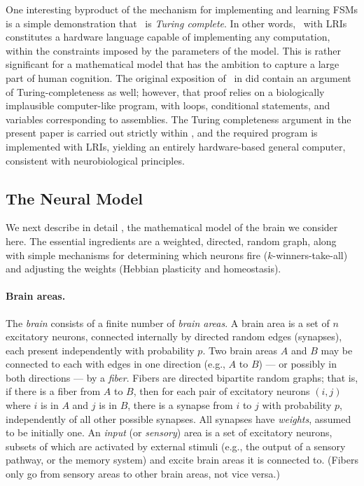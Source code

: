 \documentclass[12pt,nosubfloats]{alt2024} %
\newcommand{\1}{\mathbbm{1}}
\begin{document}
One interesting byproduct of the mechanism for implementing and learning FSMs is a simple demonstration that \name\ is {\em Turing complete}. In other words, \name\  with LRIs constitutes a hardware language capable of implementing any computation, within the constraints imposed by the parameters of the model.  This is rather significant for a mathematical model that has the ambition to capture a large part of human cognition.  The original exposition of \name\  in \cite{papadimitriou2020brain} did contain an argument of Turing-completeness as well; however, that proof relies on a biologically implausible computer-like program, with loops, conditional statements, and variables corresponding to assemblies.  The Turing completeness argument in the present paper is carried out strictly within \name, and the required program is implemented with LRIs, yielding an entirely hardware-based general computer, consistent with neurobiological principles. 

\subsection{The Neural Model}
We next describe in detail \name, the mathematical model of the brain we consider here. The essential ingredients are a weighted, directed, random graph, along with simple mechanisms for determining which neurons fire ($k$-winners-take-all) and adjusting the weights (Hebbian plasticity and homeostasis).

\paragraph{Brain areas.}  The {\em brain} consists of a finite number of \emph{brain areas}.  A brain area is a set of $n$ excitatory neurons, connected internally by directed random edges (synapses), each present independently with probability $p$. Two brain areas $A$ and $B$ may be connected to each with edges in one direction (e.g., $A$ to $B$) --- or possibly in both directions --- by a {\em fiber}.  Fibers are directed bipartite random graphs; that is, if there is a fiber from $A$ to $B$, then for each pair of excitatory neurons $(i,j)$ where $i$ is in $A$ and $j$ is in $B$, there is a synapse from $i$ to $j$ with probability $p$, independently of all other possible synapses. All synapses have {\em weights}, assumed to be initially one.  An {\em input} (or {\em sensory}) area is a set of excitatory neurons, subsets of which are activated by external stimuli (e.g., the output of a sensory pathway, or the memory system) and excite brain areas it is connected to. (Fibers only go from sensory areas to other brain areas, not vice versa.)
\end{document}
